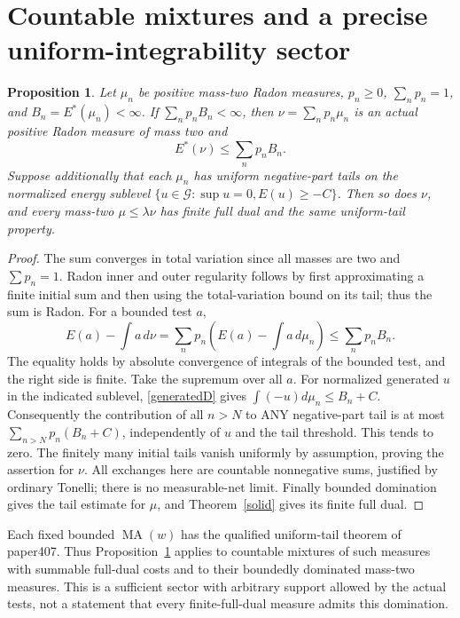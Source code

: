 \documentclass[11pt]{article}
\newtheorem{proposition}[theorem]{Proposition}
\newcommand{\G}{\mathcal G}
\newcommand{\MA}{\operatorname{MA}}
\begin{document}
\section{Countable mixtures and a precise uniform-integrability sector}
\begin{proposition}\label{mixture}
Let $\mu_n$ be positive mass-two Radon measures,
$p_n\ge0$, $\sum_n p_n=1$, and
$B_n=E^*(\mu_n)<\infty$. If $\sum_n p_nB_n<\infty$, then
$\nu=\sum_n p_n\mu_n$ is an actual positive Radon measure of mass
two and
\begin{equation}\label{mixdual}
 E^*(\nu)\le\sum_n p_nB_n.
\end{equation}
Suppose additionally that each $\mu_n$ has uniform negative-part tails
on the normalized energy sublevel $\{u\in\G:\sup u=0,E(u)\ge-C\}$.
Then so does $\nu$, and every mass-two $\mu\le\lambda\nu$ has finite
full dual and the same uniform-tail property.
\end{proposition}
\begin{proof}
The sum converges in total variation since all masses are two and
$\sum p_n=1$. Radon inner and outer regularity follows by first
approximating a finite initial sum and then using the total-variation
bound on its tail; thus the sum is Radon. For a bounded test $a$,
\[
 E(a)-\int a\,d\nu
   =\sum_n p_n\left(E(a)-\int a\,d\mu_n\right)
   \le\sum_n p_nB_n.
\]
The equality holds by absolute convergence of integrals of the bounded
test, and the right side is finite. Take the supremum over all $a$.
For normalized generated $u$ in the indicated sublevel,
\eqref{generatedD} gives $\int(-u)d\mu_n\le B_n+C$.
Consequently the contribution of all $n>N$ to ANY negative-part tail
is at most $\sum_{n>N}p_n(B_n+C)$, independently of $u$ and the
tail threshold. This tends to zero. The finitely many initial tails
vanish uniformly by assumption, proving the assertion for $\nu$.
All exchanges here are countable nonnegative sums, justified by
ordinary Tonelli; there is no measurable-net limit. Finally bounded
domination gives the tail estimate for $\mu$, and Theorem~\ref{solid}
gives its finite full dual.
\end{proof}

Each fixed bounded $\MA(w)$ has the qualified uniform-tail theorem
of paper407. Thus Proposition~\ref{mixture} applies to countable
mixtures of such measures with summable full-dual costs and to their
boundedly dominated mass-two measures. This is a sufficient sector
with arbitrary support allowed by the actual tests, not a statement
that every finite-full-dual measure admits this domination.
\end{document}
